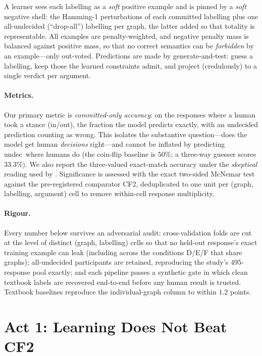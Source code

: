 \documentclass[11pt]{article}
\newcommand{\pred}[1]{\textsf{#1}}
\begin{document}
A learner sees each labelling as a \emph{soft} positive example and is pinned by a \emph{soft}
negative shell: the Hamming-1 perturbations of each committed labelling plus one all-undecided
(``drop-all'') labelling per graph, the latter added so that totality is representable. All
examples are penalty-weighted, and negative penalty mass is balanced against positive mass, so
that no correct semantics can be \emph{forbidden} by an example---only out-voted. Predictions are
made by generate-and-test: guess a labelling, keep those the learned constraints admit, and project
(credulously) to a single verdict per argument.

\paragraph{Metrics.} Our primary metric is \emph{committed-only accuracy}: on the responses where
a human took a stance (\pred{in}/\pred{out}), the fraction the model predicts exactly, with an
undecided prediction counting as wrong. This isolates the substantive question---does the model get
human \emph{decisions} right---and cannot be inflated by predicting \pred{undec}\ where humans do
(the coin-flip baseline is $50\%$; a three-way guesser scores $33.3\%$). We also report the
three-valued exact-match accuracy under the \emph{skeptical} reading used by
\citet{guillaume2022}. Significance is assessed with the exact two-sided McNemar test against the
pre-registered comparator CF2, deduplicated to one unit per (graph, labelling, argument) cell to
remove within-cell response multiplicity.

\paragraph{Rigour.} Every number below survives an adversarial audit: cross-validation folds are
cut at the level of distinct (graph, labelling) cells so that no held-out response's exact training
example can leak (including across the conditions D/E/F that share graphs); all-undecided
participants are retained, reproducing the study's $495$-response pool exactly; and each pipeline
passes a synthetic gate in which clean textbook labels are recovered end-to-end before any human
result is trusted. Textbook baselines reproduce the \citeauthor{guillaume2022} individual-graph
column to within $1.2$ points.

\section{Act 1: Learning Does Not Beat CF2}
\label{sec:act1}
\end{document}
